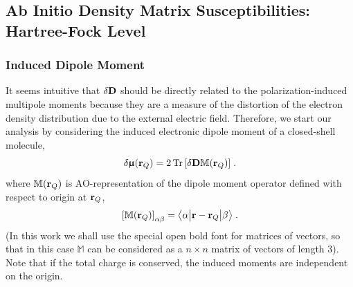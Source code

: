 \documentclass[aip,amsmath,amssymb,reprint]{revtex4-1}
\newcommand{\tbraket}[3]{\ensuremath{\bigl\langle {#1} \bigl\lvert {#2} \bigl\lvert {#3} \bigr\rangle}}
\newcommand{\BM}[1]{\bm{#1}}
\DeclareMathOperator{\Tr}{Tr}
\begin{document}
\subsection{Ab Initio Density Matrix Susceptibilities: Hartree-Fock Level}

\subsubsection{Induced Dipole Moment}

It seems intuitive that $\delta {\bf D}$ should 
be directly related to the
polarization\hyp{}induced multipole moments because they are
a measure of the distortion of the electron density distribution due to the external electric
field. 
Therefore, 
we start our analysis by considering the induced electronic dipole moment 
of a closed-shell molecule, %
%
\begin{equation} \label{e:dmu-exact}
 \delta {\BM{\upmu}}({\bf r}_Q) = 
     2 \Tr{ 
         \left[ 
              \delta {\bf D} {\mathbb{M}({\bf r}_Q)}
         \right] } \;.
\end{equation}
%
where ${\mathbb{M}({\bf r}_Q)}$ is AO\hyp{}representation
of the dipole moment operator defined with respect to origin at ${\bf r}_Q$,
%
\begin{equation}\label{e:m}
 \left[ {\mathbb{M}({\bf r}_Q)} \right]_{\alpha\beta} = \tbraket{\alpha}{{\bf r} - {\bf r}_Q}{\beta} \;.
\end{equation}
%
(In this work we shall use the special open bold font for matrices of vectors, so that
in this case ${\mathbb{M}}$ can be considered as a $n \times n$ matrix of vectors of length 3).
Note that if the total charge is conserved, the induced moments are independent on the origin.
\end{document}
